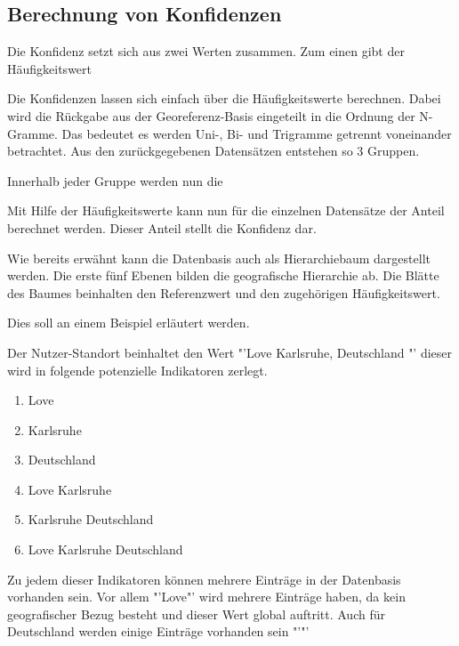		\subsection{Berechnung von Konfidenzen}

			Die Konfidenz setzt sich aus zwei Werten zusammen. 
			Zum einen gibt der Häufigkeitswert

			Die Konfidenzen lassen sich einfach über die Häufigkeitswerte berechnen. 
			Dabei wird die Rückgabe aus der Georeferenz-Basis eingeteilt in die Ordnung der N-Gramme. 
			Das bedeutet es werden Uni-, Bi- und Trigramme getrennt voneinander betrachtet.
			Aus den zurückgegebenen Datensätzen entstehen so 3 Gruppen.

			Innerhalb jeder Gruppe werden nun die 

			Mit Hilfe der Häufigkeitswerte kann nun für die einzelnen Datensätze der Anteil berechnet werden. 
			Dieser Anteil stellt die Konfidenz dar. 

			Wie bereits erwähnt kann die Datenbasis auch als Hierarchiebaum dargestellt werden. 
			Die erste fünf Ebenen bilden die geografische Hierarchie ab. 
			Die Blätte des Baumes beinhalten den Referenzwert und den zugehörigen Häufigkeitswert.


		Dies soll an einem Beispiel erläutert werden.

		Der Nutzer-Standort beinhaltet den Wert "'Love Karlsruhe, Deutschland "' dieser wird in folgende potenzielle Indikatoren zerlegt.

		\begin{multicols}{2}
			\begin{enumerate}
			   		\item Love
			   		\item Karlsruhe
			   		\item Deutschland
			   		\item Love Karlsruhe
			   		\item Karlsruhe Deutschland
			   		\item Love Karlsruhe Deutschland
			\end{enumerate}   	
		\end{multicols}

		Zu jedem dieser Indikatoren können mehrere Einträge in der Datenbasis vorhanden sein. 
		Vor allem "'Love"' wird mehrere Einträge haben, da kein geografischer Bezug besteht und dieser Wert global auftritt.
		Auch für Deutschland werden einige Einträge vorhanden sein "'"'    
		
		


